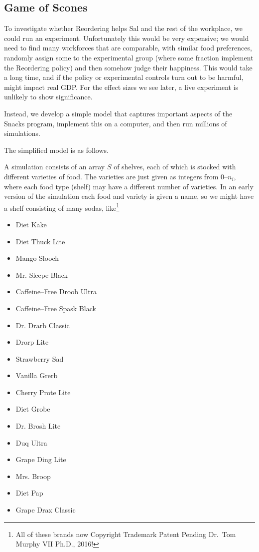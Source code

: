 \documentclass[twocolumn]{article}
\begin{document}
\subsection{Game of Scones}

To investigate whether Reordering helps Sal and the rest of the workplace, we could run an experiment. Unfortunately this would be very expensive; we would need to find many workforces that are comparable, with similar food preferences, randomly assign some to the experimental group (where some fraction implement the Reordering policy) and then somehow judge their happiness. This would take a long time, and if the policy or experimental controls turn out to be harmful, might impact real GDP. For the effect sizes we see later, a live experiment is unlikely to show significance.

Instead, we develop a simple model that captures important aspects of the Snacks program, implement this on a computer, and then run millions of simulations.

The simplified model is as follows.

A simulation consists of an array $S$ of shelves, each of which is stocked with different varieties of food. The varieties are just given as integers from 0--$n_i$, where each food type (shelf) may have a different number of varieties. In an early version of the simulation each food and variety is given a name, so we might have a shelf consisting of many sodas, like\footnote{All of these brands now Copyright Trademark Patent Pending Dr.~Tom Murphy VII Ph.D., 2016!}

\begin{itemize}
\item Diet Kake 
\item Diet Thuck Lite
\item Mango Slooch 
\item Mr. Sleepe Black
\item Caffeine--Free Droob Ultra
\item Caffeine--Free Spask Black
\item Dr. Drarb Classic
\item Drorp Lite
\item Strawberry Sad 
\item Vanilla Grerb
\item Cherry Prote Lite
\item Diet Grobe
\item Dr. Brosh Lite
\item Duq Ultra
\item Grape Ding Lite
\item Mrs. Broop 
\item Diet Pap 
\item Grape Drax Classic
\end{itemize}
\end{document}
